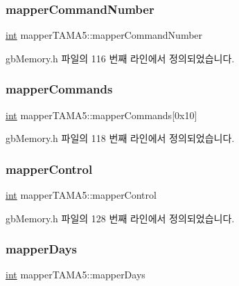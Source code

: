 \subsubsection{\texorpdfstring{mapper\+Command\+Number}{mapperCommandNumber}}
{\footnotesize\ttfamily \mbox{\hyperlink{_util_8cpp_a0ef32aa8672df19503a49fab2d0c8071}{int}} mapper\+T\+A\+M\+A5\+::mapper\+Command\+Number}



gb\+Memory.\+h 파일의 116 번째 라인에서 정의되었습니다.

\mbox{\label{structmapper_t_a_m_a5_acaae7b31142e0906a0a19477007d755c}} 
\subsubsection{\texorpdfstring{mapper\+Commands}{mapperCommands}}
{\footnotesize\ttfamily \mbox{\hyperlink{_util_8cpp_a0ef32aa8672df19503a49fab2d0c8071}{int}} mapper\+T\+A\+M\+A5\+::mapper\+Commands\mbox{[}0x10\mbox{]}}



gb\+Memory.\+h 파일의 118 번째 라인에서 정의되었습니다.

\mbox{\label{structmapper_t_a_m_a5_aecd47b2b0c963d9f7d41aaf562c67ebd}} 
\subsubsection{\texorpdfstring{mapper\+Control}{mapperControl}}
{\footnotesize\ttfamily \mbox{\hyperlink{_util_8cpp_a0ef32aa8672df19503a49fab2d0c8071}{int}} mapper\+T\+A\+M\+A5\+::mapper\+Control}



gb\+Memory.\+h 파일의 128 번째 라인에서 정의되었습니다.

\mbox{\label{structmapper_t_a_m_a5_aee94a4b7e0b59dc7eec9b27d708d6b40}} 
\subsubsection{\texorpdfstring{mapper\+Days}{mapperDays}}
{\footnotesize\ttfamily \mbox{\hyperlink{_util_8cpp_a0ef32aa8672df19503a49fab2d0c8071}{int}} mapper\+T\+A\+M\+A5\+::mapper\+Days}



